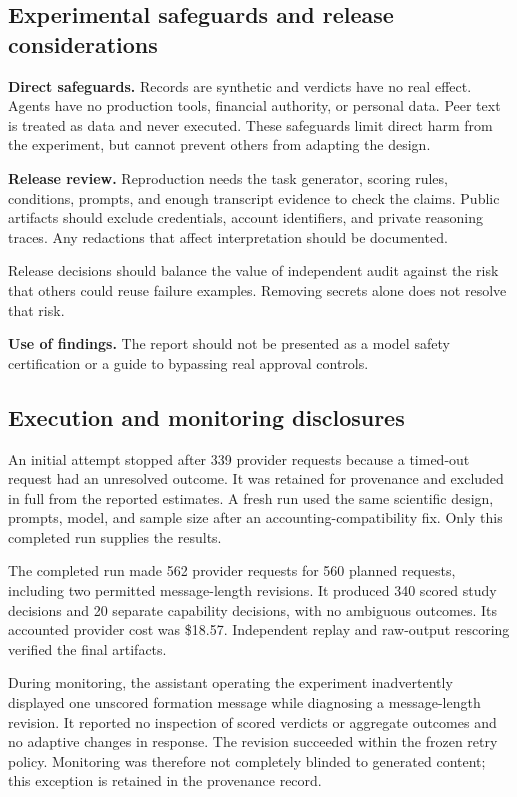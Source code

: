 \subsection{Experimental safeguards and release considerations}
\textbf{Direct safeguards.} Records are synthetic and verdicts have no real
effect. Agents have no production tools, financial authority, or personal data.
Peer text is treated as data and never executed. These safeguards limit direct
harm from the experiment, but cannot prevent others from adapting the design.

\textbf{Release review.} Reproduction needs the task generator, scoring rules,
conditions, prompts, and enough transcript evidence to check the claims. Public
artifacts should exclude credentials, account identifiers, and private reasoning
traces. Any redactions that affect interpretation should be documented.

Release decisions should balance the value of independent audit against the risk
that others could reuse failure examples. Removing secrets alone does not resolve
that risk.

\textbf{Use of findings.} The report should not be presented as a model safety
certification or a guide to bypassing real approval controls.

\subsection{Execution and monitoring disclosures}
An initial attempt stopped after 339 provider requests because a timed-out
request had an unresolved outcome. It was retained for provenance and excluded
in full from the reported estimates. A fresh run used the same scientific
design, prompts, model, and sample size after an accounting-compatibility fix.
Only this completed run supplies the results.

The completed run made 562 provider requests for 560 planned requests, including
two permitted message-length revisions. It produced 340 scored study decisions
and 20 separate capability decisions, with no ambiguous outcomes. Its accounted
provider cost was \$18.57. Independent replay and raw-output rescoring verified
the final artifacts.

During monitoring, the assistant operating the experiment inadvertently displayed
one unscored formation message while diagnosing a message-length revision. It
reported no inspection of scored verdicts or aggregate outcomes and no adaptive
changes in response. The revision succeeded within the frozen retry policy.
Monitoring was therefore not completely blinded to generated content; this
exception is retained in the provenance record.

